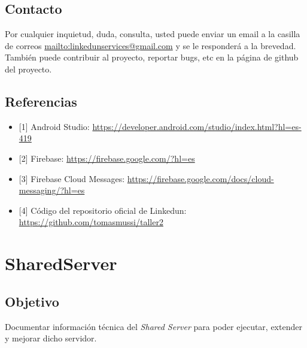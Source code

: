 \documentclass[a4paper,10pt,spanish]{sphinxmanual}
\begin{document}
\section{Contacto}
\label{appAndroid:contacto}
Por cualquier inquietud, duda, consulta, usted puede enviar un email a la casilla de correos \url{mailto:linkedunservices@gmail.com} y se le responderá a la brevedad.
También puede contribuir al proyecto, reportar bugs, etc en la página de github del proyecto.


\section{Referencias}
\label{appAndroid:referencias}\begin{itemize}
\item {} 
{[}1{]} Android Studio: \url{https://developer.android.com/studio/index.html?hl=es-419}

\item {} 
{[}2{]} Firebase: \url{https://firebase.google.com/?hl=es}

\item {} 
{[}3{]} Firebase Cloud Messages: \url{https://firebase.google.com/docs/cloud-messaging/?hl=es}

\item {} 
{[}4{]} Código del repositorio oficial de Linkedun: \url{https://github.com/tomasmussi/taller2}

\end{itemize}


\chapter{SharedServer}
\label{index:sharedserver}

\section{Objetivo}
\label{sharedServer:objetivo}\label{sharedServer::doc}
Documentar información técnica del \emph{Shared Server} para poder ejecutar, extender y mejorar dicho servidor.
\end{document}
